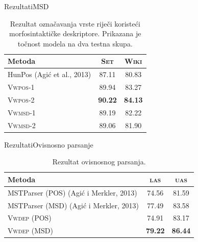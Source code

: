 \documentclass{beamer}
\begin{document}
\begin{frame}{Rezultati}{MSD}
  \begin{table}
  \centering
  \caption[Rezultat označavanja vrste riječi koristeći morfosintaktičke
  deskriptore.]{Rezultat označavanja vrste riječi koristeći morfosintaktičke
  deskriptore. Prikazana je točnost modela na dva testna skupa.}
  \label{table:msdtagging}
  \begin{tabular}{|l|c|c|}
  \hline
  Metoda                               & \textsc{Set}   & \textsc{Wiki}  \\ \hline \hline
  HunPos (Agić et al., 2013)           & 87.11          & 80.83          \\
  \textsc{Vwpos-1}                     & 89.94          & 83.27          \\
  \textsc{Vwpos-2}                     & \textbf{90.22} & \textbf{84.13} \\
  \textsc{Vwmsd-1}                     & 89.19          & 82.22          \\
  \textsc{Vwmsd-2}                     & 89.06          & 81.90          \\ \hline
  \end{tabular}
  \end{table}
\end{frame}

\begin{frame}{Rezultati}{Ovisnosno parsanje}
\begin{table}
\centering
\caption{Rezultat ovisnosnog parsanja.}
\label{table:depparsing}
\begin{tabular}{|l|c|c|}
\hline
Metoda                                & \textsc{las}   & \textsc{uas}    \\ \hline \hline
MSTParser (POS) (Agić i Merkler, 2013) & 74.56          & 81.59           \\
MSTParser (MSD) (Agić i Merkler, 2013) & 77.49          & 83.58           \\
\textsc{Vwdep} (POS)                  & 74.91          & 83.17           \\
\textsc{Vwdep} (MSD)                  & \textbf{79.22} & \textbf{86.44}  \\ \hline
\end{tabular}
\end{table}
\end{frame}
\end{document}
